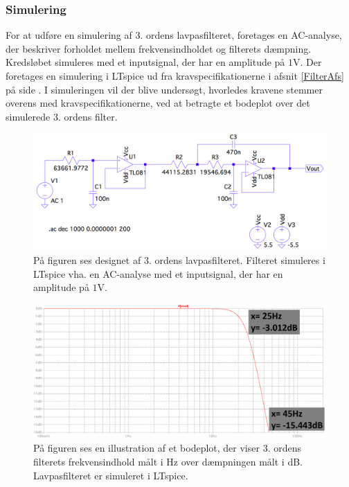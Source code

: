 \subsubsection{Simulering}
For at udføre en simulering af $3$. ordens lavpasfilteret, foretages en AC-analyse, der beskriver forholdet mellem frekvensindholdet og filterets dæmpning. Kredsløbet simuleres med et inputsignal, der har en amplitude på $1$V. Der foretages en simulering i LTspice ud fra kravspecifikationerne i afsnit \ref{FilterAfs} på side \pageref{FilterAfs}. I simuleringen vil der blive undersøgt, hvorledes kravene stemmer overens med kravspecifikationerne, ved at betragte et bodeplot over det simulerede $3$. ordens filter.
\begin{figure}[H]
	\centering
	\includegraphics[scale=0.35]{figures/cProblemloesning/Lavpasfilter_LTspice.PNG}
	\caption{På figuren ses designet af $3$. ordens lavpasfilteret. Filteret simuleres i LTspice vha. en AC-analyse med et inputsignal, der har en amplitude på $1$V.}
	\label{fig:lavpasfilter_LTspice}
\end{figure}
\begin{figure}[H]
	\centering
	\includegraphics[scale=0.38]{figures/cProblemloesning/Lavpasfiltergraf_LTspice2.PNG}
	\caption{På figuren ses en illustration af et bodeplot, der viser $3$. ordens filterets frekvensindhold målt i Hz over dæmpningen målt i dB. Lavpasfilteret er simuleret i LTspice.}
	\label{fig:lavpasfiltergraf_LTspice1}
\end{figure}
